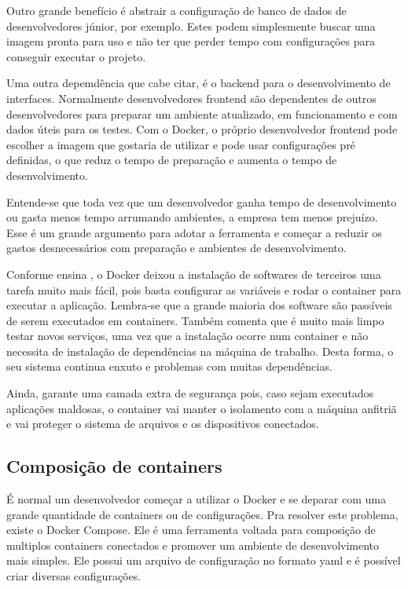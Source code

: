 \documentclass[
	12pt,				%
	openright,			%
	oneside,			%
	a4paper,			%
	chapter=TITLE,		%
	section=TITLE,		%
	english,			%
	french,				%
	spanish,			%
	brazil				%
	]{abntex2}
\begin{document}
Outro grande benefício é abstrair a configuração de banco de dados de desenvolvedores júnior, por exemplo. Estes podem simplesmente buscar uma imagem pronta para uso e não ter que perder tempo com configurações para conseguir executar o projeto.

Uma outra depemdência que cabe citar, é o backend para o desenvolvimento de interfaces. Normalmente desenvolvedores frontend são dependentes de outros desenvolvedores para preparar um ambiente atualizado, em funcionamento e com dados úteis para os testes. Com o Docker, o próprio desenvolvedor frontend pode escolher a imagem que gostaria de utilizar e pode usar configurações pré definidas, o que reduz o tempo de preparação e aumenta o tempo de desenvolvimento.

Entende-se que toda vez que um desenvolvedor ganha tempo de desenvolvimento ou gasta menos tempo arrumando ambientes, a empresa tem menos prejuízo. Esse é um grande argumento para adotar a ferramenta e começar a reduzir os gastos desnecessários com preparação e ambientes de desenvolvimento.

Conforme ensina , o Docker deixou a instalação de softwares de terceiros uma tarefa muito mais fácil, pois basta configurar as variáveis e rodar o container para executar a aplicação. Lembra-se que a grande maioria dos software são passíveis de serem executados em containers. Também comenta que é muito mais limpo testar novos serviços, uma vez que a instalação ocorre num container e não necessita de instalação de dependências na máquina de trabalho. Desta forma, o seu sistema continua enxuto e problemas com muitas dependências.

Ainda, garante uma camada extra de segurança pois, caso sejam executados aplicações maldosas, o container vai manter o isolamento com a máquina anfitriã e vai proteger o sistema de arquivos e os dispositivos conectados.

\subsection{Composição de containers}

É normal um desenvolvedor começar a utilizar o Docker e se deparar com uma grande quantidade de containers ou de configurações. Pra resolver este problema, existe o Docker Compose. Ele é uma ferramenta voltada para composição de multiplos containers conectados e promover um ambiente de desenvolvimento mais simples. Ele possui um arquivo de configuração no formato yaml e é possível criar diversas configurações.
\end{document}
